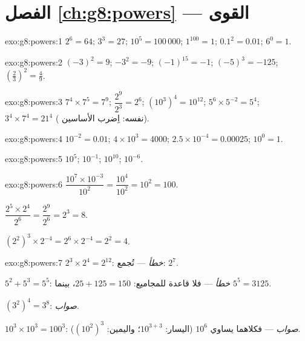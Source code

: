 \section*{الفصل \ref{ch:g8:powers} --- القوى}

\begin{solution}{exo:g8:powers:1}
$2^6 = 64$; \quad $3^3 = 27$; \quad $10^5 = 100\,000$; \quad
$1^{100} = 1$; \quad $0.1^2 = 0.01$; \quad $6^0 = 1$.
\end{solution}

\begin{solution}{exo:g8:powers:2}
$(-3)^2 = 9$; \quad $-3^2 = -9$; \quad $(-1)^{15} = -1$; \quad
$(-5)^3 = -125$; \quad $\left(\frac23\right)^2 = \frac49$.
\end{solution}

\begin{solution}{exo:g8:powers:3}
$7^4 \times 7^5 = 7^9$; \quad
$\dfrac{2^9}{2^3} = 2^6$; \quad
$\left(10^3\right)^4 = 10^{12}$; \quad
$5^6 \times 5^{-2} = 5^4$; \quad
$3^4 \times 7^4 = 21^4$ ( نفسه: اِضرب الأساسين).
\end{solution}

\begin{solution}{exo:g8:powers:4}
$10^{-2} = 0.01$; \quad
$4 \times 10^3 = 4000$; \quad
$2.5 \times 10^{-4} = 0.00025$; \quad
$10^0 = 1$.
\end{solution}

\begin{solution}{exo:g8:powers:5}
$10^5$; \quad $10^{-1}$; \quad $10^{10}$; \quad $10^{-6}$.
\end{solution}

\begin{solution}{exo:g8:powers:6}
$\dfrac{10^7 \times 10^{-3}}{10^2} = \dfrac{10^4}{10^2} = 10^2 =
100$.

$\dfrac{2^5 \times 2^4}{2^6} = \dfrac{2^9}{2^6} = 2^3 = 8$.

$\left(2^2\right)^3 \times 2^{-4} = 2^6 \times 2^{-4} = 2^2 = 4$.
\end{solution}

\begin{solution}{exo:g8:powers:7}
$2^3 \times 2^4 = 2^{12}$: \emph{خطأ} ---  تُجمع:
$2^7$.

$5^2 + 5^3 = 5^5$: \emph{خطأ} --- فلا قاعدة للمجاميع:
$25 + 125 = 150$، بينما $5^5 = 3125$.

$(3^2)^4 = 3^8$: \emph{صواب}.

$10^3 \times 10^3 = 100^3$: \emph{صواب} --- فكلاهما يساوي $10^6$
(اليسار: $10^{3+3}$؛ واليمين: $(10^2)^3$).
\end{solution}

